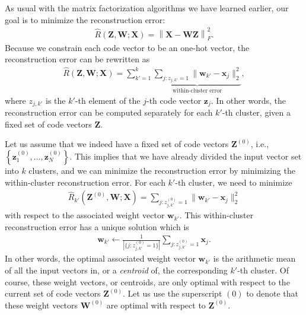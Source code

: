 \documentclass{report}
\newcommand{\vect}[1]{\mathbf{#1}}
\newcommand{\matr}[1]{\mathbf{#1}}
\newcommand{\vx}[0]{\vect{x}}
\newcommand{\vz}[0]{\vect{z}}
\newcommand{\vw}[0]{\vect{w}}
\newcommand{\mW}[0]{\matr{W}}
\newcommand{\mZ}[0]{\matr{Z}}
\newcommand{\mX}[0]{\matr{X}}
\begin{document}
As usual with the matrix factorization algorithms we have learned earlier, our
goal is to minimize the reconstruction error:
\begin{align*}
    \hat{R}(\mZ, \mW; \mX) = \left\| \mX - \mW \mZ \right\|_F^2.
\end{align*}
Because we constrain each code vector to be an one-hot vector, the
reconstruction error can be rewritten as
\begin{align*}
    \hat{R}(\mZ, \mW; \mX) = 
    \sum_{k'=1}^k \underbrace{
        \sum_{j: z_{j,k'} = 1} \| \vw_{k'} - \vx_j \|_2^2
}_{
        \text{within-cluster error}
    },
\end{align*}
where $z_{j,k'}$ is the $k'$-th element of the $j$-th code vector $\vz_j$. In
other words, the reconstruction error can be computed separately for each
$k'$-th cluster, given a fixed set of code vectors $\mZ$.

Let us assume that we indeed have a fixed set of code vectors $\mZ^{(0)}$, i.e.,
$\left\{ \vz_1^{(0)}, \ldots, \vz_N^{(0)} \right\}$. This implies that we have
already divided the input vector set into $k$ clusters, and we can minimize the
reconstruction error by minimizing the within-cluster reconstruction error. For
each $k'$-th cluster, we need to minimize
\begin{align*}
    \hat{R}_{k'}(\mZ^{(0)}, \mW; \mX) = 
    \sum_{j: z_{j,k'}^{(0)} = 1} \| \vw_{k'} - \vx_j \|_2^2
\end{align*}
with respect to the associated weight vector $\vw_{k'}$. This within-cluster
reconstruction error has a unique solution which is
\begin{align}
    \label{eq:km_max}
    \vw_{k'} \leftarrow \frac{1}{\left|
        \{j: z_{j,k'}^{(0)} = 1\}
    \right|} \sum_{j: z_{j,k'}^{(0)} = 1} \vx_j.
\end{align}
In other words, the optimal associated weight vector $\vw_{k'}$ is the
arithmetic mean of all the input vectors in, or a {\it centroid} of, the
corresponding $k'$-th cluster. Of course, these weight vectors, or centroids,
are only optimal with respect to the current set of code vectors $\mZ^{(0)}$.
Let us use the superscript $(0)$ to denote that these weight vectors $\mW^{(0)}$
are optimal with respect to $\mZ^{(0)}$.
\end{document}
